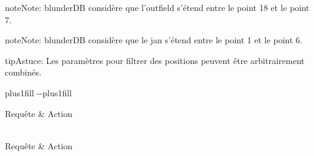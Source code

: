 \documentclass[letterpaper,10pt,french]{sphinxmanual}
\begin{document}
\begin{sphinxadmonition}{note}{Note:}
\sphinxAtStartPar
blunderDB considère que l’outfield s’étend entre le point 18 et le point 7.
\end{sphinxadmonition}

\begin{sphinxadmonition}{note}{Note:}
\sphinxAtStartPar
blunderDB considère que le jan s’étend entre le point 1 et le point 6.
\end{sphinxadmonition}

\begin{sphinxadmonition}{tip}{Astuce:}
\sphinxAtStartPar
Les paramètres pour filtrer des positions peuvent être arbitrairement
combinés.
\end{sphinxadmonition}


\begin{savenotes}
\sphinxatlongtablestart
\sphinxthistablewithglobalstyle
\makeatletter
  \LTleft \@totalleftmargin plus1fill
  \LTright\dimexpr\columnwidth-\@totalleftmargin-\linewidth\relax plus1fill
\makeatother
\begin{longtable}{}
\sphinxtoprule
\sphinxstyletheadfamily 
\sphinxAtStartPar
Requête
&\sphinxstyletheadfamily 
\sphinxAtStartPar
Action
\\
\sphinxmidrule
\endfirsthead

\\
\sphinxtoprule
\sphinxstyletheadfamily 
\sphinxAtStartPar
Requête
&\sphinxstyletheadfamily 
\sphinxAtStartPar
Action
\\
\sphinxmidrule
\endhead

\sphinxbottomrule
{}\\
\endfoot

\endlastfoot
\sphinxtableatstartofbodyhook


\end{longtable}
\end{savenotes}
\end{document}
